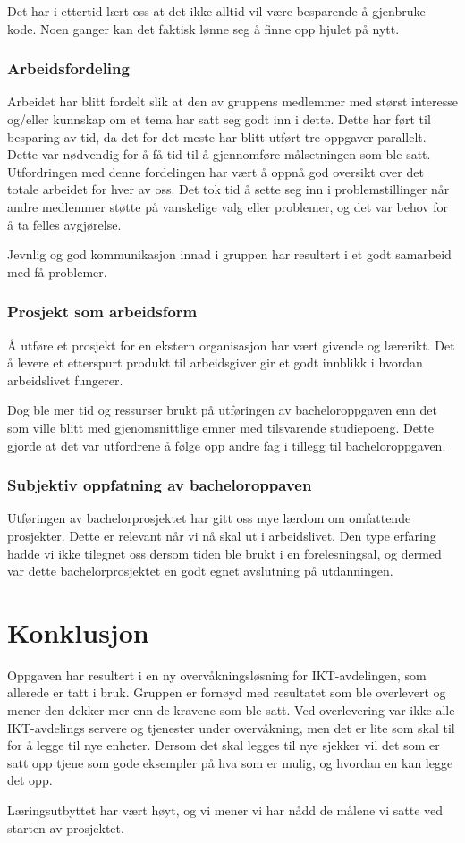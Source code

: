 Det har i ettertid lært oss at det ikke alltid vil være besparende å gjenbruke kode. Noen ganger kan det faktisk lønne seg å finne opp hjulet på nytt.

\subsubsection{Arbeidsfordeling}
Arbeidet har blitt fordelt slik at den av gruppens medlemmer med størst interesse og/eller kunnskap om et tema har satt seg godt inn i dette. Dette har ført til besparing av tid, da det for det meste har blitt utført tre oppgaver parallelt. Dette var nødvendig for å få tid til å gjennomføre målsetningen som ble satt. Utfordringen med denne fordelingen har vært å oppnå god oversikt over det totale arbeidet for hver av oss. Det tok tid å sette seg inn i problemstillinger når andre medlemmer støtte på vanskelige valg eller problemer, og det var behov for å ta felles avgjørelse.

Jevnlig og god kommunikasjon innad i gruppen har resultert i et godt samarbeid med få problemer. 

\subsubsection{Prosjekt som arbeidsform}
Å utføre et prosjekt for en ekstern organisasjon har vært givende og lærerikt. Det å levere et etterspurt produkt til arbeidsgiver gir et godt innblikk i hvordan arbeidslivet fungerer.

Dog ble mer tid og ressurser brukt på utføringen av bacheloroppgaven enn det som ville blitt med gjenomsnittlige emner med tilsvarende studiepoeng. Dette gjorde at det var utfordrene å følge opp andre fag i tillegg til bacheloroppgaven.

\subsubsection{Subjektiv oppfatning av bacheloroppaven}
Utføringen av bachelorprosjektet har gitt oss mye lærdom om omfattende prosjekter. Dette er relevant når vi nå skal ut i arbeidslivet. Den type erfaring hadde vi ikke tilegnet oss dersom tiden ble brukt i en forelesningsal, og dermed var dette bachelorprosjektet en godt egnet avslutning på utdanningen. 

\section{Konklusjon}
Oppgaven har resultert i en ny overvåkningsløsning for IKT-avdelingen, som allerede er tatt i bruk. Gruppen er fornøyd med resultatet som ble overlevert og mener den dekker mer enn de kravene som ble satt. Ved overlevering var ikke alle IKT-avdelings servere og tjenester under overvåkning, men det er lite som skal til for å legge til nye enheter. Dersom det skal legges til nye sjekker vil det som er satt opp tjene som gode eksempler på hva som er mulig, og hvordan en kan legge det opp.

Læringsutbyttet har vært høyt, og vi mener vi har nådd de målene vi satte ved starten av prosjektet. 
